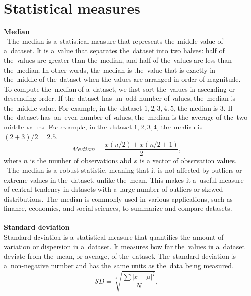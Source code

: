     \section{Statistical measures} \label{subsec:statistics}
    \textbf{Median}\\
   ~The~median is a~statistical measure that represents the~middle value of a~dataset. It is a~value that separates
    the~dataset into two halves: half of the~values are greater than the~median, and half of the~values are less than
    the~median. In other words, the~median is the~value that is exactly in the~middle of the~dataset when the
    values are arranged in order of magnitude.
    \\
    To compute the~median of a~dataset, we first sort the~values in ascending or descending order. If the~dataset
    has~an~odd number of values, the~median is the~middle value. For example, in the~dataset ${1, 2, 3, 4, 5}$, the
    median is $3$. If the~dataset has~an~even number of values, the~median is the~average of the~two middle values.
    For example, in the~dataset ${1, 2, 3, 4}$, the~median is $(2 + 3) / 2 = 2.5$.\\
    \begin{equation}
        Median = \frac{x(n/2) + x(n/2 + 1)}{2},
        \label{eq:median}
    \end{equation}
    where $n$ is the number of observations abd $x$ is a vector of observation values.\\
   ~The~median is a~robust statistic, meaning that it is not affected by outliers or extreme values in the~dataset,
    unlike the~mean. This makes it a~useful measure of central tendency in datasets with a~large number of outliers or
    skewed distributions. The~median is commonly used in various applications, such as finance, economics, and social
    sciences, to summarize and compare datasets.\\
    \\
    \textbf{Standard deviation}\\
    Standard deviation is a~statistical measure that quantifies the~amount of variation or dispersion in a~dataset.
    It measures how far the~values in a~dataset deviate from the~mean, or average, of the~dataset. The~standard
    deviation is a~non-negative number and has the~same units as the~data being measured.\\
    \begin{equation}
        SD = \sqrt[2]{\frac{\sum \lvert x - \mu \rvert^2}{N}},
    \end{equation}
